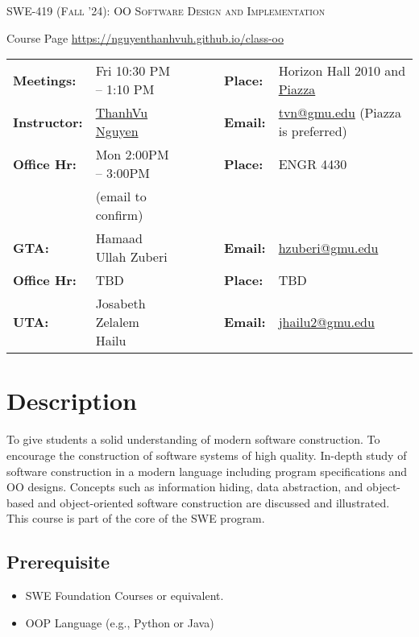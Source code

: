 \documentclass[11pt]{article}
\begin{document}
\begin{center}
{\Large \textsc{SWE-419 (Fall '24): OO Software Design and Implementation}}
\end{center}
\begin{center}
Course Page \url{https://nguyenthanhvuh.github.io/class-oo}
\end{center}



\begin{minipage}[t]{.75\textwidth}
    \centering
\begin{tabular}{llcccll}
  \toprule
  \textbf{Meetings:} & Fri 10:30 PM -- 1:10 PM  & & & & \textbf{Place:} & Horizon Hall 2010 and \href{https://piazza.com/gmu/fall2024/swe419nguyen}{Piazza}\\
\textbf{Instructor:} & \href{https://go.gmu.edu/tvn}{ThanhVu Nguyen} & & &  & \textbf{Email:} &  \href{mailto:tvn@gmu.edu}{tvn@gmu.edu} (Piazza is preferred)\\
\textbf{Office Hr:} & Mon 2:00PM -- 3:00PM & & & & \textbf{Place:} & ENGR 4430\\
                     &(email to confirm)&&&&&\\
  \hline
\textbf{GTA:} & Hamaad Ullah Zuberi & & &  & \textbf{Email:} &  \href{mailto:hzuberi@gmu.edu}{hzuberi@gmu.edu}\\
\textbf{Office Hr:} & TBD & & & & \textbf{Place:} & TBD \\
  \hline
\textbf{UTA:} & Josabeth Zelalem Hailu & & &  & \textbf{Email:} &  \href{mailto:jhailu2@gmu.edu}{jhailu2@gmu.edu}\\
\bottomrule
\end{tabular}
\end{minipage}


\section{Description}

   To give students a solid understanding of modern software construction. To encourage the construction of software systems of high quality. In-depth study of software construction in a modern language including program specifications and OO designs. Concepts such as information hiding, data abstraction, and object-based and object-oriented software construction are discussed and illustrated. This course is part of the core of the SWE program.

\subsection{Prerequisite}
\begin{itemize}
\item SWE Foundation Courses or equivalent.
\item OOP Language (e.g., Python or Java)
\end{itemize}
\end{document}
